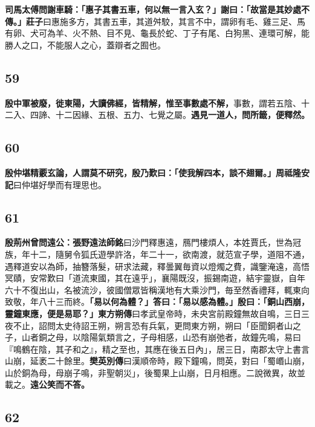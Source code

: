 \textbf{司馬太傅問謝車騎：「惠子其書五車，何以無一言入玄？」謝曰：「故當是其妙處不傳。」}{\footnotesize \textbf{莊子}曰惠施多方，其書五車，其道舛駮，其言不中，謂卵有毛、雞三足、馬有卵、犬可為羊、火不熱、目不見、龜長於蛇、丁子有尾、白狗黑、連環可解，能勝人之口，不能服人之心，蓋辯者之囿也。}

\subsection*{59}

\textbf{殷中軍被廢，徙東陽，大讀佛經，皆精解，惟至事數處不解，}{\footnotesize 事數，謂若五陰、十二入、四諦、十二因緣、五根、五力、七覺之屬。}\textbf{遇見一道人，問所籤，便釋然。}

\subsection*{60}

\textbf{殷仲堪精覈玄論，人謂莫不研究，殷乃歎曰：「使我解四本，談不翅爾。」}{\footnotesize \textbf{周祗隆安記}曰仲堪好學而有理思也。}

\subsection*{61}

\textbf{殷荊州曾問遠公：}{\footnotesize \textbf{張野遠法師銘}曰沙門釋惠遠，鴈門樓煩人，本姓賈氏，世為冠族，年十二，隨舅令狐氏遊學許洛，年二十一，欲南渡，就范宣子學，道阻不通，遇釋道安以為師，抽簪落髮，研求法藏，釋曇翼毎資以燈燭之費，識鑒淹遠，高悟冥賾，安常歎曰「道流東國，其在遠乎」，襄陽既沒，振錫南遊，結宇靈嶽，自年六十不復出山，名被流沙，彼國僧眾皆稱漢地有大乘沙門，毎至然香禮拜，輒東向致敬，年八十三而終。}\textbf{「易以何為體？」答曰：「易以感為體。」殷曰：「銅山西崩，靈鐘東應，便是易耶？」}{\footnotesize \textbf{東方朔傳}曰孝武皇帝時，未央宮前殿鐘無故自鳴，三日三夜不止，詔問太史待詔王朔，朔言恐有兵氣，更問東方朔，朔曰「臣聞銅者山之子，山者銅之母，以陰陽氣類言之，子母相感，山恐有崩弛者，故鐘先鳴，易曰『鳴鶴在陰，其子和之』，精之至也，其應在後五日內」，居三日，南郡太守上書言山崩，延袤二十餘里。\textbf{樊英別傳}曰漢順帝時，殿下鐘鳴，問英，對曰「蜀㟭山崩，山於銅為母，母崩子鳴，非聖朝災」，後蜀果上山崩，日月相應。二說微異，故並載之。}\textbf{遠公笑而不答。}

\subsection*{62}

